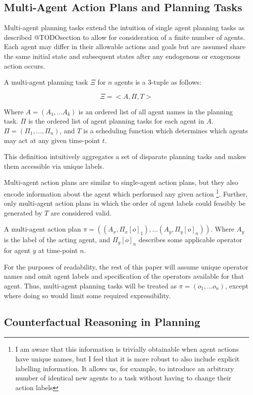 \documentclass{article}
\theoremstyle{plain}
\theoremstyle{definition}
\begin{document}
\subsection{Multi-Agent Action Plans and Planning Tasks}
Multi-agent planning tasks extend the intuition of single agent planning tasks as described @TODOsection to allow for consideration of a finite number of agents. Each agent may differ in their allowable actions and goals but are assumed share the same initial state and subsequent states after any endogenous or exogenous action occurs.

A multi-agent planning task $\Xi$ for $n$ agents is a 3-tuple as follows:

\[
\Xi = <A, \Pi, T>
\]

 Where $A=(A_1,...A_k)$ is an ordered list of all agent names in the planning task. $\Pi$ is the ordered list of agent planning tasks for each agent in $A$. $\Pi=(\Pi_1,...,\Pi_n)$, and $T$ is a scheduling function which determines which agents may act at any given time-point $t$.
 
This definition intuitively aggregates a set of disparate planning tasks and makes them accessible via unique labels.

Multi-agent action plans are similar to single-agent action plans, but they also encode information about the agent which performed any given action \footnote{I am aware that this information is trivially obtainable when agent actions have unique names, but I feel that it is more robust to also include explicit labelling information. It allows us, for example, to introduce an arbitrary number of identical new agents to a task without having to change their action labels}. Further, only multi-agent action plans in which the order of agent labels could feasibly be generated by $T$ are considered valid.

A multi-agent action plan $\pi=((A_x, \Pi_x[o]_1),...(A_y, \Pi_y[o]_n))$. Where $A_y$ is the label of the acting agent, and $\Pi_y[o]_n$ describes some applicable operator for agent $y$ at time-point $n$.

For the purposes of readability, the rest of this paper will assume unique operator names and omit agent labels and specification of the operators available for that agent. Thus, multi-agent planning tasks will be treated as $\pi=(o_1,...o_n)$, except where doing so would limit some required expressibility. 

\subsection{Counterfactual Reasoning in Planning}
\end{document}

